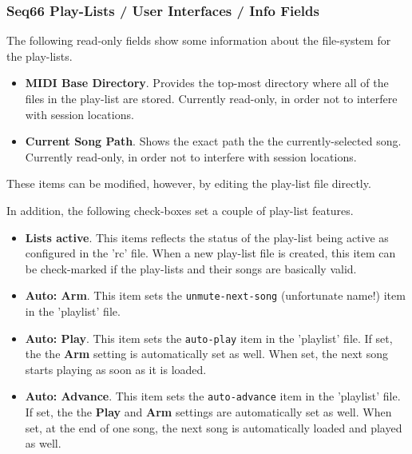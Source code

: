 \subsubsection{Seq66 Play-Lists / User Interfaces / Info Fields}
\label{subsubsec:playlist_ui_info_fields}

   The following read-only fields show some information about the file-system
   for the play-lists.

   \begin{itemize}
      \item \textbf{MIDI Base Directory}.
         Provides the top-most directory where all of the files in the
         play-list are stored.
         Currently read-only, in order not to interfere with session locations.
      \item \textbf{Current Song Path}.
         Shows the exact path the the currently-selected song.
         Currently read-only, in order not to interfere with session locations.
   \end{itemize}

   These items can be modified, however, by editing the play-list file
   directly.

   In addition, the following check-boxes set a couple of play-list features.
   
   \begin{itemize}
      \item \textbf{Lists active}.
         This items reflects the status of the play-list being active as
         configured in the 'rc' file.
         When a new play-list file is created, this item can be check-marked
         if the play-lists and their songs are basically valid.
      \item \textbf{Auto: Arm}.
         This item sets the \texttt{unmute-next-song} (unfortunate name!)
         item in the 'playlist' file.
      \item \textbf{Auto: Play}.
         This item sets the \texttt{auto-play} item in the 'playlist'
         file. If set, the the \textbf{Arm} setting is automatically set as
         well. When set, the next song starts playing as soon as it
         is loaded.
      \item \textbf{Auto: Advance}.
         This item sets the \texttt{auto-advance} item in the 'playlist'
         file. If set, the the \textbf{Play} and \textbf{Arm}
         settings are automatically set as well.
         When set, at the end of one song, the next song is automatically
         loaded and played as well.
   \end{itemize}

